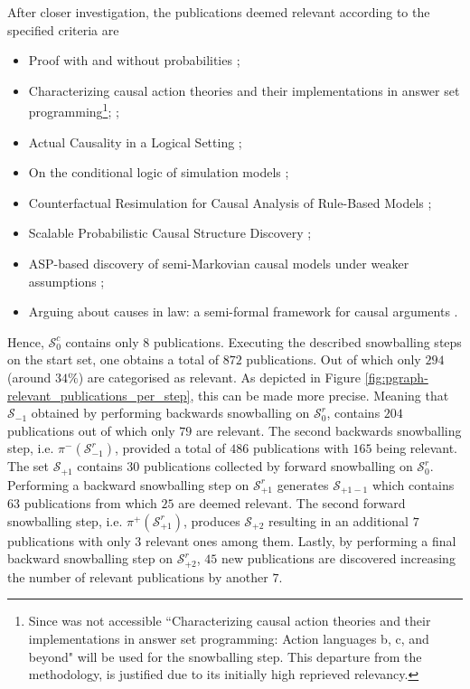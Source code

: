 \documentclass[11pt,a4paper]{book}
\theoremstyle{definition}
\theoremstyle{definition}
\theoremstyle{definition}
\theoremstyle{remark}
\newcommand{\xsetz}{\mathcal{S}_{\mathit{0}}}
\newcommand{\xsetb}{\mathcal{S}_{\mathit{-1}}}
\newcommand{\xsetf}{\mathcal{S}_{\mathit{+1}}}
\newcommand{\xsetff}{\mathcal{S}_{\mathit{+2}}}
\newcommand{\xsetfb}{\mathcal{S}_{\mathit{+1-1}}}
\begin{document}
After closer investigation, the publications deemed relevant according to the specified criteria are 
\begin{itemize}
\item Proof with and without probabilities \parencite{verheij2017proof};
\item Characterizing causal action theories and their implementations in answer set programming\footnote{Since \parencite{zhang2017characterizing} was not accessible ``Characterizing causal action theories and their implementations in answer set programming: Action languages b, c, and beyond" \parencite{zhang2015characterizing} will be used for the snowballing step. This departure from the methodology, is justified due to its initially high reprieved relevancy.}; \parencite{zhang2017characterizing};
\item Actual Causality in a Logical Setting \parencite{bochman2018actual};
\item On the conditional logic of simulation models \parencite{ibeling2018conditional};
\item  Counterfactual Resimulation for Causal Analysis of Rule-Based Models \parencite{laurent2018counterfactual};
\item Scalable Probabilistic Causal Structure Discovery \parencite{sridhar2018scalable};
\item  ASP-based discovery of semi-Markovian causal models under weaker assumptions \parencite{zhang2019asp};
\item Arguing about causes in law: a semi-formal framework for causal arguments \parencite{Liepina2019ArguingAC}.
\end{itemize}
Hence, $\xsetz^c$ contains only $8$ publications.
Executing the described snowballing steps on the start set, one obtains a total of $872$ publications. Out of which only $294$ (around $34 \%$) are categorised as relevant. 
As depicted in Figure \ref{fig:pgraph-relevant_publications_per_step}, this can be made more precise. Meaning that $\xsetb$ obtained by performing backwards snowballing on $\xsetz^r$, contains $204$ publications out of which only $79$ are relevant. The second backwards snowballing step, i.e. $\pi^-(\xsetb^r)$, provided a total of $486$ publications with $165$ being relevant. The set $\xsetf$ contains $30$ publications collected by forward snowballing on $\xsetz^r$. Performing a backward snowballing step on $\xsetf^r$ generates $\xsetfb$ which contains $63$ publications from which $25$ are deemed relevant. The second forward snowballing step, i.e. $\pi^+(\xsetf^r)$, produces $\xsetff$ resulting in an additional $7$ publications with only $3$ relevant ones among them. Lastly, by performing a final backward snowballing step on $\xsetff^r$, $45$ new publications are discovered increasing the number of relevant publications by another $7$.  
\end{document}

